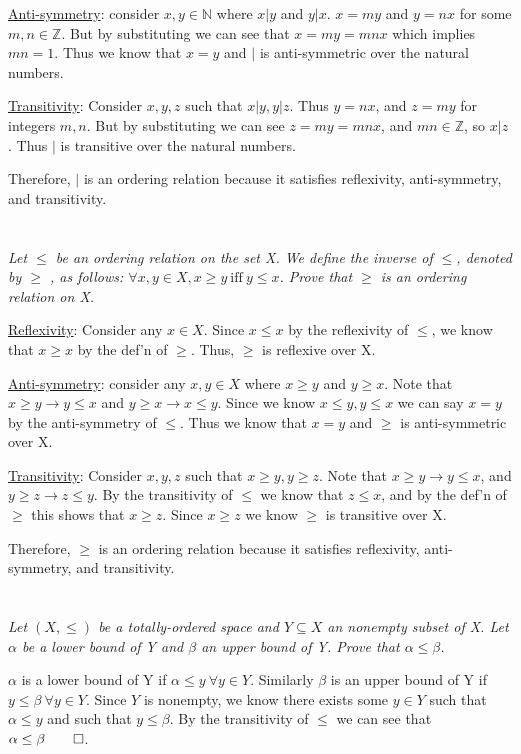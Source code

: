\documentclass[]{article}
\newcommand{\integers}{\mathbb{Z}}
\newcommand{\naturals}{\mathbb{N}}
\begin{document}
			\underline{Anti-symmetry}: consider $x, y \in \naturals$ where $x | y$ and $y | x$. $x = my$ and $y = nx$ for some $m, n \in \integers$. But by substituting we can see that $x = my = mnx$ which implies $mn = 1$. Thus we know that $x = y$ and $|$ is anti-symmetric over the natural numbers.

			\underline{Transitivity}: Consider $x, y, z$ such that $x | y, y | z$. Thus $y = nx$, and $z = my$ for integers $m, n$. But by substituting we can see $z = my = mnx$, and $mn \in \integers$, so $x | z$. Thus $|$ is transitive over the natural numbers. 

			Therefore, $|$ is an ordering relation because it satisfies reflexivity, anti-symmetry, and transitivity. 

	\section{}
		\textit{Let $\leq$ be an ordering relation on the set X. We define the inverse of $\leq$, denoted by $\geq$ , as follows: $\forall x, y \in X, x \geq y\ \text{iff}\ y \leq x$. Prove that $\geq$ is an ordering relation on X.}

			\underline{Reflexivity}: Consider any $x \in X$. Since $x \leq x$ by the reflexivity of $\leq$, we know that $x \geq x$ by the def'n of $\geq$. Thus, $\geq$ is reflexive over X.

			\underline{Anti-symmetry}: consider any $x, y \in X$ where $x \geq y$ and $y \geq x$. Note that $x \geq y \rightarrow y \leq x$ and $y \geq x \rightarrow x \leq y$. Since we know $x \leq y, y \leq x$ we can say $x = y$ by the anti-symmetry of $\leq$. Thus we know that $x = y$ and $\geq$ is anti-symmetric over X.

			\underline{Transitivity}: Consider $x, y, z$ such that $x \geq y, y \geq z$. Note that $x \geq y \rightarrow y \leq x$, and $y \geq z \rightarrow z \leq y$. By the transitivity of $\leq$ we know that $z \leq x$, and by the def'n of $\geq$ this shows that $x \geq z$. Since $x \geq z$ we know $\geq$ is transitive over X. 

			Therefore, $\geq$ is an ordering relation because it satisfies reflexivity, anti-symmetry, and transitivity. 

	\section{}
		\textit{Let $(X,\leq)$ be a totally-ordered space and $Y \subseteq X$ an nonempty subset of X. Let $\alpha$ be a lower bound of Y and $\beta$ an upper bound of Y. Prove that $\alpha \leq \beta$.}

			$\alpha$ is a lower bound of Y if $\alpha \leq y\ \forall y \in Y$. Similarly $\beta$ is an upper bound of Y if $y \leq \beta\ \forall y \in Y$. Since $Y$ is nonempty, we know there exists some $y \in Y$ such that $\alpha \leq y$ and such that $y \leq \beta$. By the transitivity of $\leq$ we can see that $\alpha \leq \beta \qed$. 
\end{document}
